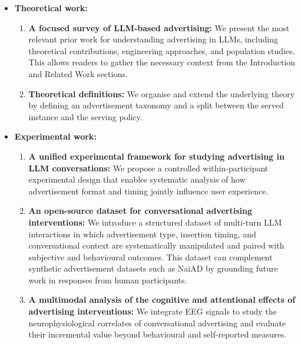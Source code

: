\documentclass[english]{article}
\begin{document}
\begin{itemize}
    \item \textbf{Theoretical work:}
    \begin{enumerate}
        \item \textbf{A focused survey of LLM-based advertising:}
        We present the most relevant prior work for understanding advertising in
        LLMs, including theoretical contributions, engineering approaches, and
        population studies. This allows readers to gather the necessary context
        from the Introduction and Related Work sections.

        \item \textbf{Theoretical definitions:}
        We organise and extend the underlying theory by defining an advertisement
        taxonomy and a split between the served instance and the serving policy.
    \end{enumerate}

    \item \textbf{Experimental work:}
    \begin{enumerate}
        \item \textbf{A unified experimental framework for studying advertising in
        LLM conversations:}
        We propose a controlled within-participant experimental design that enables
        systematic analysis of how advertisement format and timing
        jointly influence user experience.

        \item \textbf{An open-source dataset for conversational advertising
        interventions:}
        We introduce a structured dataset of multi-turn LLM interactions in which
        advertisement type, insertion timing, and conversational context are
        systematically manipulated and paired with subjective and behavioural
        outcomes. This dataset can complement synthetic
        advertisement datasets such as NaiAD \cite{zhang2026naiad} by grounding
        future work in responses from human participants.

        \item \textbf{A multimodal analysis of the cognitive and attentional effects
        of advertising interventions:}
        We integrate EEG signals to study the neurophysiological correlates of
        conversational advertising and evaluate their incremental value beyond
        behavioural and self-reported measures.
    \end{enumerate}
\end{itemize}
\end{document}
